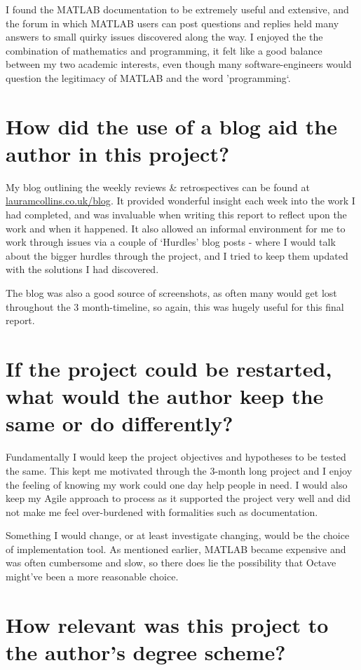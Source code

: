 I found the MATLAB documentation to be extremely useful and extensive, and the forum in which MATLAB users can post questions and replies held many answers to small quirky issues discovered along the way. I enjoyed the the combination of mathematics and programming, it felt like a good balance between my two academic interests, even though many software-engineers would question the legitimacy of MATLAB and the word 'programming`.

\section{How did the use of a blog aid the author in this project?}
\label{sec:blog}

My blog outlining the weekly reviews \& retrospectives can be found at \url{lauramcollins.co.uk/blog}. It provided wonderful insight each week into the work I had completed, and was invaluable when writing this report to reflect upon the work and when it happened. It also allowed an informal environment for me to work through issues via a couple of `Hurdles' blog posts - where I would talk about the bigger hurdles through the project, and I tried to keep them updated with the solutions I had discovered.

The blog was also a good source of screenshots, as often many would get lost throughout the 3 month-timeline, so again, this was hugely useful for this final report.

\section{If the project could be restarted, what would the author keep the same or do differently?}

Fundamentally I would keep the project objectives and hypotheses to be tested the same. This kept me motivated through the 3-month long project and I enjoy the feeling of knowing my work could one day help people in need. I would also keep my Agile approach to process as it supported the project very well and did not make me feel over-burdened with formalities such as documentation.

Something I would change, or at least investigate changing, would be the choice of implementation tool. As mentioned earlier, MATLAB became expensive and was often cumbersome and slow, so there does lie the possibility that Octave might've been a more reasonable choice.

\section{How relevant was this project to the author's degree scheme?}


